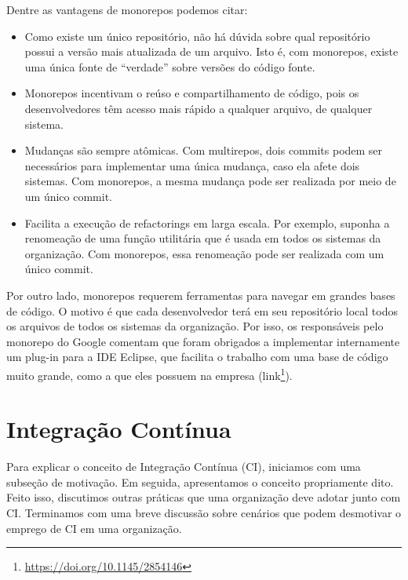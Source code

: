 \documentclass[
  11pt,
  twoside]{book}
\DeclareRobustCommand{\href}[2]{#2\footnote{\url{#1}}}
\begin{document}
Dentre as vantagens de monorepos podemos citar:

\begin{itemize}
\item
  Como existe um único repositório, não há dúvida sobre qual repositório
  possui a versão mais atualizada de um arquivo. Isto é, com monorepos,
  existe uma única fonte de ``verdade'' sobre versões do código fonte.
\item
  Monorepos incentivam o reúso e compartilhamento de código, pois os
  desenvolvedores têm acesso mais rápido a qualquer arquivo, de qualquer
  sistema.
\item
  Mudanças são sempre atômicas. Com multirepos, dois commits podem ser
  necessários para implementar uma única mudança, caso ela afete dois
  sistemas. Com monorepos, a mesma mudança pode ser realizada por meio
  de um único commit.
\item
  Facilita a execução de refactorings em larga escala. Por exemplo,
  suponha a renomeação de uma função utilitária que é usada em todos os
  sistemas da organização. Com monorepos, essa renomeação pode ser
  realizada com um único commit.
\end{itemize}

 Por outro lado, monorepos requerem ferramentas para
navegar em grandes bases de código. O motivo é que cada desenvolvedor
terá em seu repositório local todos os arquivos de todos os sistemas da
organização. Por isso, os responsáveis pelo monorepo do Google comentam
que foram obrigados a implementar internamente um plug-in para a IDE
Eclipse, que facilita o trabalho com uma base de código muito grande,
como a que eles possuem na empresa
(\href{https://doi.org/10.1145/2854146}{link}).

\hypertarget{integrauxe7uxe3o-contuxednua}{%
\section{Integração Contínua}\label{integrauxe7uxe3o-contuxednua}}

 

Para explicar o conceito de Integração Contínua (CI), iniciamos com uma
subseção de motivação. Em seguida, apresentamos o conceito propriamente
dito. Feito isso, discutimos outras práticas que uma organização deve
adotar junto com CI. Terminamos com uma breve discussão sobre cenários
que podem desmotivar o emprego de CI em uma organização.
\end{document}
